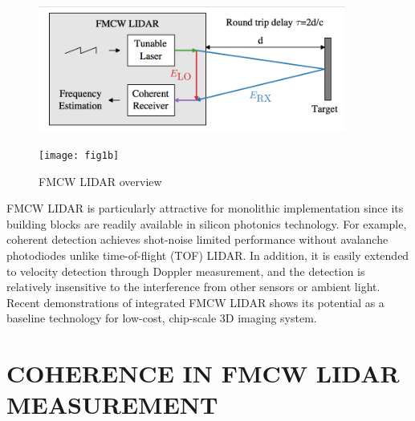 \documentclass{article}
\begin{document}
\begin{figure}[t!]
\begin{minipage}[b]{1.0\linewidth}
  \centering
  \centerline{\includegraphics[width=0.9\textwidth]{fig1a}}
\end{minipage}
\begin{minipage}[b]{1.0\linewidth}
  \centering
  \centerline{\texttt{[image: fig1b]}}
  \vspace{-0.5em}
\end{minipage}
\caption{FMCW LIDAR overview}
  \vspace{-1em}
\label{fig:overview}
\end{figure}

FMCW LIDAR is particularly attractive for monolithic implementation since its building blocks are readily available in silicon photonics technology. For example, coherent detection achieves shot-noise limited performance without avalanche photodiodes unlike time-of-flight (TOF) LIDAR. In addition, it is easily extended to velocity detection through Doppler measurement, and the detection is relatively insensitive to the interference from other sensors or ambient light. Recent demonstrations of integrated FMCW LIDAR shows its potential as a baseline technology for low-cost, chip-scale 3D imaging system.



\section{COHERENCE IN FMCW LIDAR MEASUREMENT}
\label{sec:psd}

\end{document}
